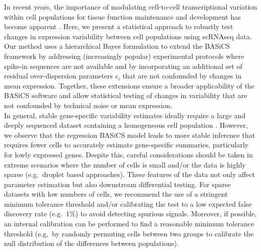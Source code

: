 In recent years, the importance of modulating cell-to-cell transcriptional variation within cell populations for tissue function maintenance and development has become apparent \citep{BaharHalpern2015, Mojtahedi2016, Goolam2016}. Here, we present a statistical approach to robustly test changes in expression variability between cell populations using scRNAseq data. Our method uses a hierarchical Bayes formulation to extend the BASiCS framework by addressing (increasingly popular) experimental protocols where spike-in sequences are not available and by incorporating an additional set of residual over-dispersion parameters $\epsilon_i$ that are not confounded by changes in mean expression. Together, these extensions ensure a broader applicability of the BASiCS software and allow statistical testing of changes in variability that are not confounded by technical noise or mean expression.  \\ 

In general, stable gene-specific variability estimates ideally require a large and deeply sequenced dataset containing a homogeneous cell population \citep[the use of unique molecular identifiers for quantifying transcript counts can also improve variability estimation, see][]{Grun2014}. However, we observe that the regression BASiCS model leads to more stable inference that requires fewer cells to accurately estimate gene-specific summaries, particularly for lowly expressed genes. Despite this, careful considerations should be taken in extreme scenarios where the number of cells is small and/or the data is highly sparse (e.g.~droplet based approaches). These features of the data not only affect parameter estimation but also downstream differential testing. For sparse datasets with low numbers of cells, we recommend the use of a stringent minimum tolerance threshold and/or calibrating the test to a low expected false discovery rate (e.g.~1\%) to avoid detecting spurious signals. Moreover, if possible, an internal calibration can be performed to find a reasonable minimum tolerance threshold (e.g.~by randomly permuting cells between two groups to calibrate the null distribution of the differences between populations). \\

